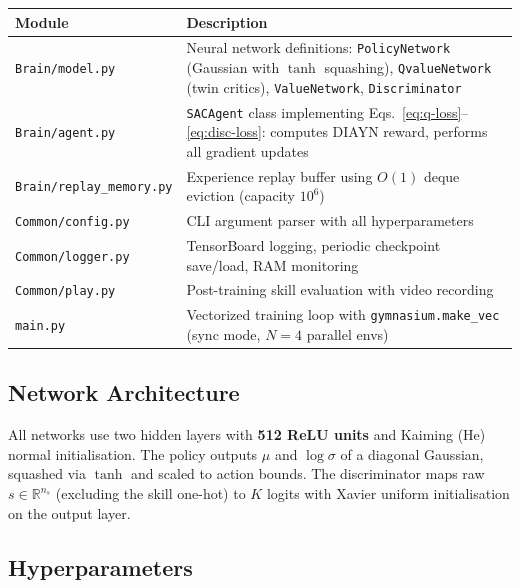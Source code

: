 \documentclass[11pt,a4paper]{article}
\begin{document}
\vspace{4pt}
\begin{center}
\small
\begin{tabular}{@{}lp{10.5cm}@{}}
\toprule
\textbf{Module} & \textbf{Description} \\
\midrule
\texttt{Brain/model.py} & Neural network definitions: \texttt{PolicyNetwork} (Gaussian with $\tanh$ squashing), \texttt{QvalueNetwork} (twin critics), \texttt{ValueNetwork}, \texttt{Discriminator} \\[3pt]
\texttt{Brain/agent.py} & \texttt{SACAgent} class implementing Eqs.~\eqref{eq:q-loss}--\eqref{eq:disc-loss}: computes DIAYN reward, performs all gradient updates \\[3pt]
\texttt{Brain/replay\_memory.py} & Experience replay buffer using $O(1)$ deque eviction (capacity $10^6$) \\[3pt]
\texttt{Common/config.py} & CLI argument parser with all hyperparameters \\[3pt]
\texttt{Common/logger.py} & TensorBoard logging, periodic checkpoint save/load, RAM monitoring \\[3pt]
\texttt{Common/play.py} & Post-training skill evaluation with video recording \\[3pt]
\texttt{main.py} & Vectorized training loop with \texttt{gymnasium.make\_vec} (sync mode, $N{=}4$ parallel envs) \\
\bottomrule
\end{tabular}
\end{center}

\subsection{Network Architecture}

All networks use two hidden layers with \textbf{512 ReLU units} and Kaiming (He) normal initialisation. The policy outputs $\mu$ and $\log\sigma$ of a diagonal Gaussian, squashed via $\tanh$ and scaled to action bounds. The discriminator maps raw $s \in \mathbb{R}^{n_s}$ (excluding the skill one-hot) to $K$ logits with Xavier uniform initialisation on the output layer.

\subsection{Hyperparameters}
\end{document}
